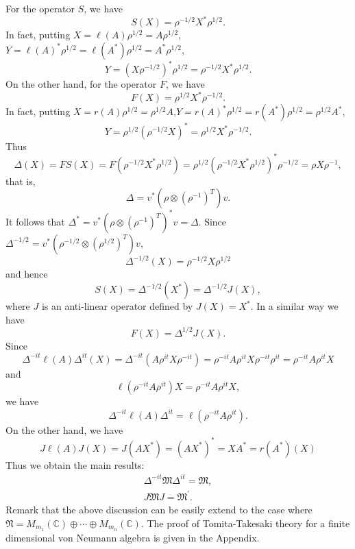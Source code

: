 For the operator $S$, we have 
	$$
    S(X)=\rho^{-1/2}X^*\rho^{1/2}.
 	$$
	In fact, putting $X=\ell(A)\rho^{1/2}=A\rho^{1/2}$,$Y=\ell(A)^\ast\rho^{1/2}=\ell(A^\ast)\rho^{1/2}=A^\ast \rho^{1/2}$,
	$$
    Y=(X\rho^{-1/2})^\ast \rho^{1/2}=\rho^{-1/2}X^\ast\rho^{1/2}.
  $$
On the other hand, for the operator $F$, we have
$$
F(X)=\rho^{1/2}X^\ast \rho^{-1/2}.
$$
In fact, putting $X=r(A)\rho^{1/2}=\rho^{1/2}A$,$Y=r(A)^\ast\rho^{1/2}=r(A^\ast)\rho^{1/2}= \rho^{1/2}A^\ast$,
	$$
    Y= \rho^{1/2}(\rho^{-1/2}X)^\ast=\rho^{1/2}X^\ast\rho^{-1/2}.
  $$
Thus
$$
\Delta(X)=FS(X)=F(\rho^{-1/2}X^*\rho^{1/2})=\rho^{1/2}(\rho^{-1/2}X^*\rho^{1/2})^\ast \rho^{-1/2}=\rho X \rho^{-1},
$$
that is, 
$$
\Delta=v^\ast(\rho \otimes ({\rho}^{-1})^T) v.
$$
It follows that $\Delta^\ast=v^\ast (\rho\otimes({\rho}^{-1})^T)^\ast v=\Delta$.
Since $\Delta^{-1/2}=v^\ast(\rho^{-1/2}\otimes ({\rho}^{1/2})^T) v$, 
$$
\Delta^{-1/2}(X)=\rho^{-1/2}X\rho^{1/2}
$$
and hence 
$$
S(X)=\Delta^{-1/2}(X^\ast)=\Delta^{-1/2}J(X),
$$
where $J$ is an anti-linear operator defined by $J(X)=X^\ast$.
In a similar way we have
$$
F(X)=\Delta^{1/2}J(X).
$$
Since
$$\Delta^{-it}\ell(A)\Delta^{it}(X)=\Delta^{-it}(A\rho^{it}X\rho^{-it})=\rho^{-it}A\rho^{it}X\rho^{-it}\rho^{it}=\rho^{-it}A\rho^{it}X$$
and 
$$
\ell(\rho^{-it}A\rho^{it})X=\rho^{-it}A\rho^{it}X,
$$
we have 
$$
\Delta^{-it}\ell(A)\Delta^{it}=\ell(\rho^{-it}A\rho^{it}).
$$
On the other hand,
we have
$$
J\ell(A)J(X)=J(AX^\ast)=(AX^\ast)^\ast=XA^\ast=r(A^\ast)(X)
$$
Thus we obtain the main results: 
\begin{equation}
\begin{split}
\Delta^{-it}\mathfrak{M}\Delta^{it}=\mathfrak{M},\\
          J\mathfrak{M}J=\mathfrak{M}^{\prime}.
\end{split}
\end{equation}
Remark that the above discussion can be easily extend to the case where 
$\mathfrak{N}=M_{m_1}(\mathbb{C})\oplus \cdots \oplus M_{m_n}(\mathbb{C})$.
The proof of Tomita-Takesaki theory for a finite dimensional von Neumann algebra is given in the Appendix.
